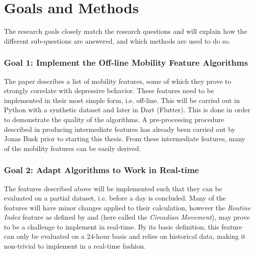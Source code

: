 \section{Goals and Methods}


The research goals closely match the research questions and will explain how the different sub-questions are answered, and which methods are used to do so.

\subsubsection*{Goal 1: Implement the Off-line Mobility Feature Algorithms}
The paper \cite{Saeb2015} describes a list of mobility features, some of which they prove to strongly correlate with depressive behavior. These features need to be implemented in their most simple form, i.e. off-line. This will be carried out in Python with a synthetic dataset and later in Dart (Flutter). This is done in order to demonstrate the quality of the algorithms. A pre-processing procedure described in \cite{sparse-location-2014} producing intermediate features has already been carried out by Jonas Busk prior to starting this thesis. From these intermediate features, many of the mobility features can be easily derived. 

\subsubsection*{Goal 2: Adapt Algorithms to Work in Real-time}
The features described above will be implemented such that they can be evaluated on a partial dataset, i.e. before a day is concluded. Many of the features will have minor changes applied to their calculation, however the \textit{Routine Index} feature as defined by \cite{extraction-of-behavioural-features} and \cite{Saeb2015}  (here called the\textit{ Circadian Movement}), may prove to be a challenge to implement in real-time. By its basic definition, this feature can only be evaluated on a 24-hour basis and relies on historical data, making it non-trivial to implement in a real-time fashion. 

